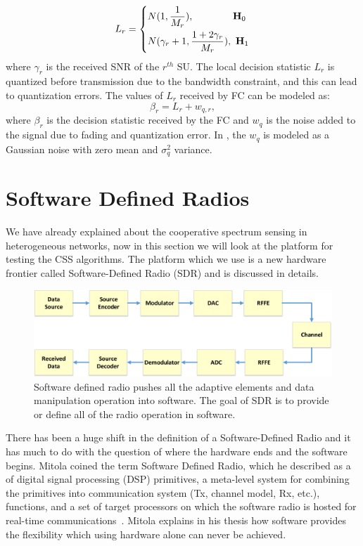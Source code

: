 \begin{equation}
	\label{eq:6}
	L_r = 
	\left\{
	\begin{aligned}
		& N(1,\dfrac{1}{M_r}),~~~~~~~~~~~~\mathbf{H}_0 \\
		& N(\gamma_r+1,\dfrac{1+2\gamma_r}{M_r}),~\mathbf{H}_1		
	\end{aligned}
	\right.
\end{equation}
where $\gamma_r$ is the received SNR of the $r^{th}$ SU. The local decision statistic $L_r$ is quantized before transmission due to the bandwidth constraint, and this can lead to quantization errors. The values of $L_r$ received by FC can be modeled as:
\begin{equation}
	\label{eq:7}
	 \beta_r = L_r + w_{q,r},
\end{equation}
where $\beta_r$ is the decision statistic received by the FC and $w_q$ is the noise added to the signal due to fading and quantization error. In \cite{arhtn14}, the $w_q$ is modeled as a Gaussian noise with zero mean and $\sigma_q^2$ variance.

\section{Software Defined Radios}
We have already explained about the cooperative spectrum sensing in heterogeneous networks, now in this section we will look at the platform for testing the CSS algorithms. The platform which we use is a new hardware frontier called Software-Defined Radio (SDR) and is discussed in details.

\begin{figure}[ht!]
	\centering
	\includegraphics[width=\textwidth,keepaspectratio]{images/Gill/figs/softwaredefinedradio.eps}
    \caption{Software defined radio pushes all the adaptive elements and data manipulation operation into software. The goal of SDR is to provide or define all of the radio operation in software.} 
\label{sdr}      
\end{figure}

There has been a huge shift in the definition of a Software-Defined Radio and it has much to do with the question of where the hardware ends and the software begins. Mitola coined the term Software Defined Radio, which he described as a of digital signal processing (DSP) primitives, a meta-level system for combining the primitives into communication system (Tx, channel model, Rx, etc.), functions, and a set of target processors on which the software radio is hosted for real-time communications~\cite{267870}. Mitola explains in his thesis how software provides the flexibility which using hardware alone can never be achieved.

